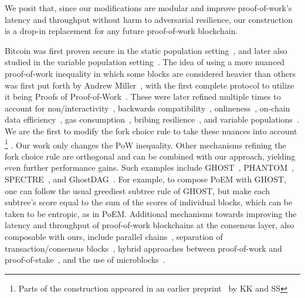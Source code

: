 We posit that, since our modifications are modular and improve proof-of-work's latency and throughput without
harm to adversarial resilience, our construction is a drop-in replacement for any
future proof-of-work blockchain.

\noindent
{}
Bitcoin was first proven secure in the static population setting~\cite{backbone},
and later also studied in the variable population setting~\cite{varbackbone}.
The idea of using a more nuanced proof-of-work inequality in which some blocks
are considered heavier than others was first put forth by Andrew Miller~\cite{highway},
with the first complete protocol to utilize it being
Proofs of Proof-of-Work~\cite{popow}. These were later refined multiple times
to account for non\-/interactivity~\cite{nipopows}, backwards compatibility~\cite{velvet-nipopows},
onlineness~\cite{logspace}, on-chain data efficiency~\cite{compact-superblocks},
gas consumption~\cite{gasefficient-nipopows},
bribing resilience~\cite{soft-power},
and variable populations~\cite{dionyziz}.
We are the first to modify the fork choice rule to take these nuances into
account%
\ifanonymous%
\else%
\footnote{Parts of the construction appeared in an earlier preprint~\cite{poem-short} by KK and SS}%
\fi%
.
Our work only changes the PoW inequality.
Other mechanisms refining the fork choice rule
are orthogonal and can be combined with our approach, yielding even
further performance gains.
Such examples include GHOST~\cite{ghost},
PHANTOM~\cite{phantom}, SPECTRE~\cite{spectre}, and GhostDAG~\cite{ghostdag}.
For example, to compose PoEM with GHOST, one can follow the usual greediest subtree rule of GHOST, but
make each subtree's score equal to the sum of the scores of individual blocks,
which can be taken to be entropic, as in PoEM.
Additional mechanisms towards improving the latency and throughput
of proof-of-work blockchains at the consensus
layer, also composable with ours, include parallel chains~\cite{parallel-chains},
separation of transaction/consensus blocks~\cite{prism},
hybrid approaches between proof-of-work and proof-of-stake~\cite{byzcoin},
and the use of microblocks~\cite{bitcoin-ng}.